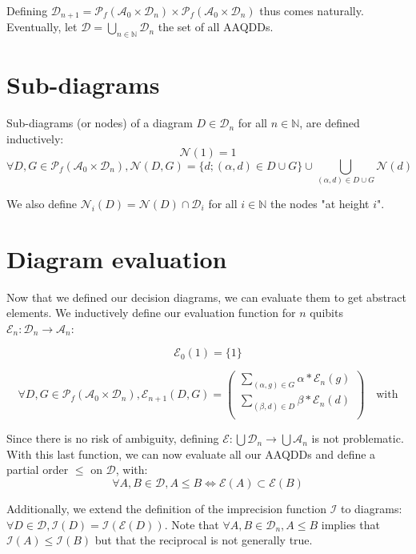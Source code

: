 Defining $\mathcal{D}_{n+1} = \mathscr{P}_f(\mathcal{A}_0 \times \mathcal{D}_n) \times \mathscr{P}_f(\mathcal{A}_0 \times \mathcal{D}_n)$ thus comes naturally. Eventually, let $\mathcal{D} = \bigcup_{n \in \mathbb{N}} \mathcal{D}_n$ the set of all AAQDDs.

\section{Sub-diagrams}

Sub-diagrams (or nodes) of a diagram $D \in \mathcal{D}_n$ for all $n \in \mathbb{N}$, are defined inductively:
$$\mathcal{N}(\boxed{1}) = \boxed{1}$$
$$\forall D, G \in \mathscr{P}_f(\mathcal{A}_0 \times \mathcal{D}_n), \mathcal{N}(D, G) = \{d ; (\alpha, d) \in D \cup G\} \cup
\bigcup_{(\alpha, d) \in D \cup G} \mathcal{N}(d)$$

We also define $\mathcal{N}_i(D) = \mathcal{N}(D) \cap \mathcal{D}_i$ for all $i \in \mathbb{N}$ the nodes "at height $i$".

\section{Diagram evaluation}

Now that we defined our decision diagrams, we can evaluate them to get abstract elements. We inductively define our evaluation function for $n$ quibits $\mathcal{E}_n : \mathcal{D}_n \rightarrow \mathcal{A}_n$:

$$\mathcal{E}_0(\boxed{1}) = \{1\}$$

$$\forall D, G \in \mathscr{P}_f(\mathcal{A}_0 \times \mathcal{D}_n), \mathcal{E}_{n+1}(D, G) =
\begin{pmatrix}
    \displaystyle\sum_{(\alpha, g) \in G} \alpha * \mathcal{E}_n(g) \\
    \displaystyle\sum_{(\beta, d) \in D} \beta * \mathcal{E}_n(d) \\
\end{pmatrix}
\quad\text{with}
$$

Since there is no risk of ambiguity, defining $\mathcal{E} : \bigcup \mathcal{D}_n \rightarrow \bigcup \mathcal{A}_n$ is not problematic. With this last function, we can now evaluate all our AAQDDs and define a partial order $\le$ on $\mathcal{D}$, with:
$$\forall A, B \in \mathcal{D}, A \le B \iff \mathcal{E}(A) \subset \mathcal{E}(B)$$

Additionally, we extend the definition of the imprecision function $\mathcal{I}$ to diagrams: $\forall D \in \mathcal{D}, \mathcal{I}(D) = \mathcal{I}(\mathcal{E}(D))$. Note that $\forall A, B \in \mathcal{D}_n, A \le B$ implies that $\mathcal{I}(A) \le \mathcal{I}(B)$ but that the reciprocal is not generally true.

